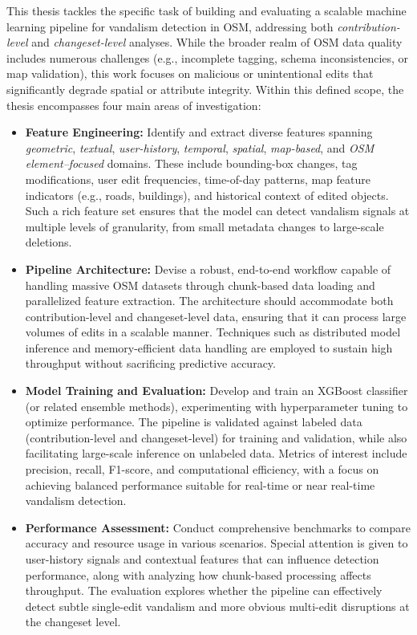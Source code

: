 \documentclass[
    13pt, %
    a4paper, %
    DIV14, %
    listof=totoc, %
    bibliography=totoc, %
    index=totoc, %
    headsepline
]{scrreprt}
\begin{document}
This thesis tackles the specific task of building and evaluating a scalable machine learning pipeline for vandalism detection in OSM, addressing both \emph{contribution-level} and \emph{changeset-level} analyses. While the broader realm of OSM data quality includes numerous challenges (e.g., incomplete tagging, schema inconsistencies, or map validation), this work focuses on malicious or unintentional edits that significantly degrade spatial or attribute integrity. Within this defined scope, the thesis encompasses four main areas of investigation:
\begin{itemize}
    \item \textbf{Feature Engineering:} Identify and extract diverse features spanning \emph{geometric}, \emph{textual}, \emph{user-history}, \emph{temporal}, \emph{spatial}, \emph{map-based}, and \emph{OSM element–focused} domains. These include bounding-box changes, tag modifications, user edit frequencies, time-of-day patterns, map feature indicators (e.g., roads, buildings), and historical context of edited objects. Such a rich feature set ensures that the model can detect vandalism signals at multiple levels of granularity, from small metadata changes to large-scale deletions.
    \item \textbf{Pipeline Architecture:} Devise a robust, end-to-end workflow capable of handling massive OSM datasets through chunk-based data loading and parallelized feature extraction. The architecture should accommodate both contribution-level and changeset-level data, ensuring that it can process large volumes of edits in a scalable manner. Techniques such as distributed model inference and memory-efficient data handling are employed to sustain high throughput without sacrificing predictive accuracy.
    \item \textbf{Model Training and Evaluation:} Develop and train an XGBoost classifier (or related ensemble methods), experimenting with hyperparameter tuning to optimize performance. The pipeline is validated against labeled data (contribution-level and changeset-level) for training and validation, while also facilitating large-scale inference on unlabeled data. Metrics of interest include precision, recall, F1-score, and computational efficiency, with a focus on achieving balanced performance suitable for real-time or near real-time vandalism detection.
    \item \textbf{Performance Assessment:} Conduct comprehensive benchmarks to compare accuracy and resource usage in various scenarios. Special attention is given to user-history signals and contextual features that can influence detection performance, along with analyzing how chunk-based processing affects throughput. The evaluation explores whether the pipeline can effectively detect subtle single-edit vandalism and more obvious multi-edit disruptions at the changeset level.
\end{itemize}
\end{document}
